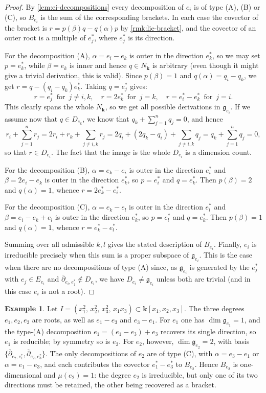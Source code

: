 \documentclass[11pt,letterpaper,reqno]{amsart}
\theoremstyle{remark}
\theoremstyle{definition}
\newtheorem{example}[example]{Example}
\newcommand{\KK}[0]{\ensuremath{\mathbf{k}}}
\begin{document}
\begin{proof}
By \cref{lem:ei-decompositions} every decomposition of $e_i$ is of type (A), (B)
or (C), so $B_{e_i}$ is the sum of the corresponding brackets. In each case the
covector of the bracket is $r=p(\beta)q-q(\alpha)p$ by \cref{rmk:lie-bracket}, and
the covector of an outer root is a multiple of $e_j^*$, where $e_j^*$ is its
direction.

For the decomposition (A), $\alpha=e_i-e_k$ is outer in the direction $e_k^*$, so we may set $p=e_k^*$, while $\beta=e_k$ is inner and hence $q\in N_\KK$ is arbitrary (even though it might give a trivial derivation, this is valid). Since $p(\beta)=1$ and
$q(\alpha)=q_i-q_k$, we get $r=q-(q_i-q_k)e_k^*$. Taking $q=e_j^*$ gives:
\[r=e_j^*\,\text{ for }\,j\neq i,k,\quad r=2e_k^*\,\text{ for }\,j=k,\quad r=e_i^*-e_k^*\,\text{ for }\,j=i.\]
This clearly spans the whole $N_\KK$, so we get all possible derivations in $\mathfrak g_{e_i}$. If we assume now that $q\in D_{e_k}$, we know that $q_k+\sum_{j=1}^n q_j=0$, and hence
\[r_i+\sum_{j=1}^n r_j=2r_i+r_k+\sum_{j\neq i,k} r_j=2q_i+(2q_k-q_i)+\sum_{j\neq i,k} q_j=q_k+\sum_{j=1}^n q_j=0,\]
so that $r\in D_{e_i}$. The fact that the image is the whole $D_{e_i}$ is a dimension count.

For the decomposition (B), $\alpha=e_k-e_i$ is outer in the direction $e_i^*$ and
$\beta=2e_i-e_k$ is outer in the direction $e_k^*$, so $p=e_i^*$ and $q=e_k^*$.
Then $p(\beta)=2$ and $q(\alpha)=1$, whence $r=2e_k^*-e_i^*$.

For the decomposition (C), $\alpha=e_k-e_l$ is outer in the direction $e_l^*$ and
$\beta=e_i-e_k+e_l$ is outer in the direction $e_k^*$, so $p=e_l^*$ and
$q=e_k^*$. Then $p(\beta)=1$ and $q(\alpha)=1$, whence $r=e_k^*-e_l^*$.

Summing over all admissible $k,l$ gives the stated description of $B_{e_i}$. Finally, $e_i$ is irreducible precisely when this sum is a proper subspace of $\mathfrak g_{e_i}$. This is the case when there are no decompositions of type \textup{(A)} since, as $\mathfrak g_{e_i}$ is generated by the $e_j^*$ with $e_j\in E_{e_i}$ and $\overline\partial_{e_i,e_j^*}\not\in D_{e_i}$, we have $D_{e_i}\neq\mathfrak g_{e_i}$ unless both are trivial (and in this case $e_i$ is not a root).
\end{proof}

\begin{example}\label{ex:ei-partial}
Let $I=(x_1^2,\,x_2^2,\,x_3^2,\,x_1x_3)\subset\KK[x_1,x_2,x_3]$. The three degrees
$e_1,e_2,e_3$ are roots, as well as $e_1-e_3$ and $e_3-e_1$. For $e_1$ one has
$\dim\mathfrak g_{e_1}=1$, and the type-(A) decomposition $e_1=(e_1-e_3)+e_3$
recovers its single direction, so $e_1$ is reducible; by symmetry so is $e_3$.
For $e_2$, however, $\dim\mathfrak g_{e_2}=2$, with basis $\{\overline{\partial}_{e_2,e_1^*},\overline{\partial}_{e_2,e_3^*}\}$. The
only decompositions of $e_2$ are of type (C), with $\alpha=e_3-e_1$ or
$\alpha=e_1-e_3$, and each contributes the covector $e_1^*-e_3^*$ to $B_{e_2}$.
Hence $B_{e_2}$ is one-dimensional and $\mu(e_2)=1$: the degree $e_2$ is
irreducible, but only one of its two directions must be retained, the other
being recovered as a bracket.
\end{example}
\end{document}
